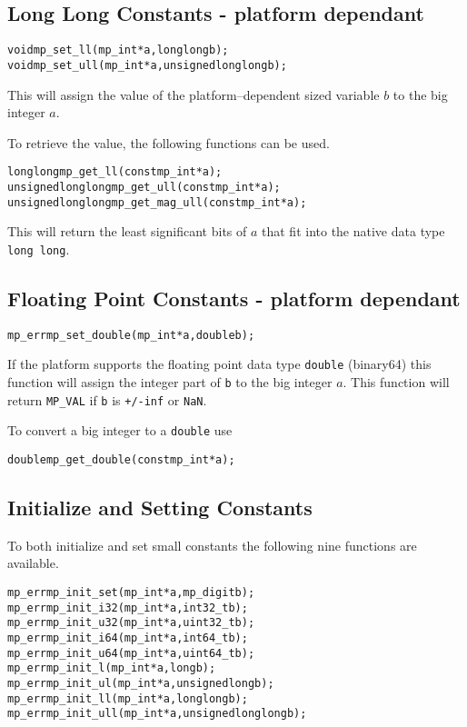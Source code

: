 \documentclass[synpaper]{book}
\begin{document}
\subsection{Long Long Constants - platform dependant}

 
\begin{alltt}
void mp_set_ll (mp_int *a, long long b);
void mp_set_ull (mp_int *a, unsigned long long b);
\end{alltt}

This will assign the value of the platform--dependent sized variable $b$ to the big integer $a$.

To retrieve the value, the following functions can be used.

\begin{alltt}
long long mp_get_ll (const mp_int *a);
unsigned long long mp_get_ull (const mp_int *a);
unsigned long long mp_get_mag_ull (const mp_int *a);
\end{alltt}

This will return the least significant bits of $a$ that fit into the native data type \texttt{long
  long}.

\subsection{Floating Point Constants - platform dependant}

\begin{alltt}
mp_err mp_set_double(mp_int *a, double b);
\end{alltt}

If the platform supports the floating point data type \texttt{double} (binary64) this function will
assign the integer part of \texttt{b} to the big integer $a$. This function will return
\texttt{MP\_VAL} if \texttt{b} is \texttt{+/-inf} or \texttt{NaN}.

To convert a big integer to a \texttt{double} use

\begin{alltt}
double mp_get_double(const mp_int *a);
\end{alltt}

\subsection{Initialize and Setting Constants}
To both initialize and set small constants the following nine functions are available.
    
   
\begin{alltt}
mp_err mp_init_set (mp_int *a, mp_digit b);
mp_err mp_init_i32 (mp_int *a, int32_t b);
mp_err mp_init_u32 (mp_int *a, uint32_t b);
mp_err mp_init_i64 (mp_int *a, int64_t b);
mp_err mp_init_u64 (mp_int *a, uint64_t b);
mp_err mp_init_l   (mp_int *a, long b);
mp_err mp_init_ul  (mp_int *a, unsigned long b);
mp_err mp_init_ll  (mp_int *a, long long b);
mp_err mp_init_ull (mp_int *a, unsigned long long b);
\end{alltt}
\end{document}
